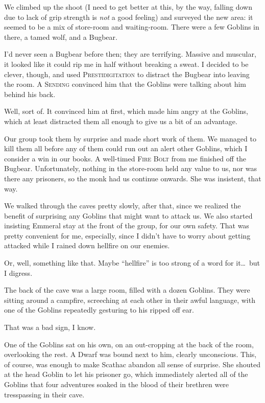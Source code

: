 We climbed up the shoot (I need to get better at this, by the way, falling down due to lack of grip strength is \emph{not} a good feeling) and surveyed the new area: it seemed to be a mix of store-room and waiting-room. There were a few Goblins in there, a tamed wolf, and a Bugbear.

I'd never seen a Bugbear before then; they are terrifying. Massive and muscular, it looked like it could rip me in half without breaking a sweat. I decided to be clever, though, and used \textsc{Prestidigitation} to distract the Bugbear into leaving the room. A \textsc{Sending} convinced him that the Goblins were talking about him behind his back.

Well, sort of. It convinced him at first, which made him angry at the Goblins, which at least distracted them all enough to give us a bit of an advantage.

Our group took them by surprise and made short work of them. We managed to kill them all before any of them could run out an alert other Goblins, which I consider a win in our books. A well-timed \textsc{Fire Bolt} from me finished off the Bugbear. Unfortunately, nothing in the store-room held any value to us, nor was there any prisoners, so the monk had us continue onwards. She was insistent, that way.

We walked through the caves pretty slowly, after that, since we realized the benefit of surprising any Goblins that might want to attack us. We also started insisting Emmeral stay at the front of the group, for our own safety. That was pretty convenient for me, especially, since I didn't have to worry about getting attacked while I rained down hellfire on our enemies.

Or, well, something like that. Maybe ``hellfire'' is too strong of a word for it\dots\ but I digress.

The back of the cave was a large room, filled with a dozen Goblins. They were sitting around a campfire, screeching at each other in their awful language, with one of the Goblins repeatedly gesturing to his ripped off ear.

That was a bad sign, I know.

One of the Goblins sat on his own, on an out-cropping at the back of the room, overlooking the rest. A Dwarf was bound next to him, clearly unconscious. This, of course, was enough to make Scathac abandon all sense of surprise. She shouted at the head Goblin to let his prisoner go, which immediately alerted all of the Goblins that four adventures soaked in the blood of their brethren were tresspassing in their cave.

